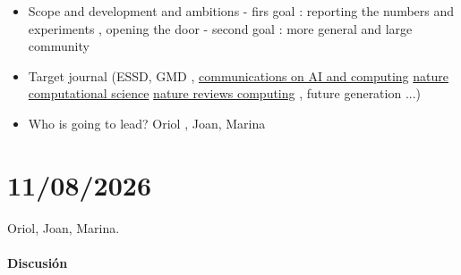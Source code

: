 \documentclass{article}
\begin{document}
\begin{itemize}
    \item  Scope and development and ambitions 
        - firs goal : reporting the numbers and experiments , opening the door 
        - second goal :  more general and large community 
    \item Target journal (ESSD, GMD , \href{https://www.nature.com/commsaicomp/}{communications on AI and computing} \href{https://www.nature.com/natcomputsci}{nature computational science} \href{https://www.nature.com/nrcomput/}{nature reviews computing} , future generation ...) 
    \item Who is going to lead? Oriol , Joan, Marina 
\end{itemize}


\section*{11/08/2026}
Oriol, Joan, Marina.

\paragraph{Discusión}
\end{document}
